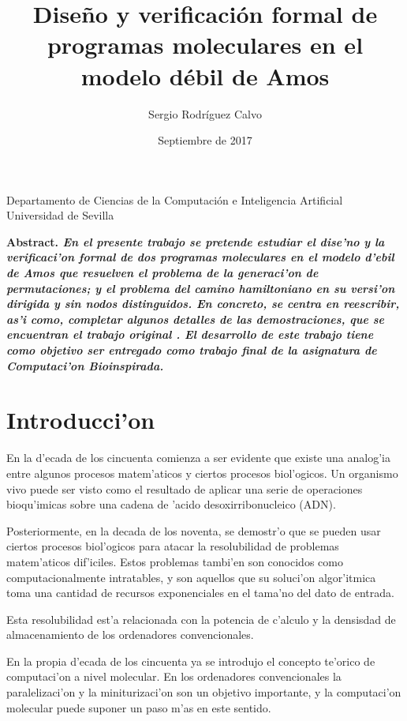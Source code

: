 \documentclass[12pt]{article}
\title{Dise\~no y verificaci\'on formal de programas moleculares en el modelo d\'ebil de Amos}
\author{Sergio Rodr\'iguez Calvo}
\date{Septiembre de 2017}
\begin{document}
    \maketitle
    \thispagestyle{empty}
    \begin{center}
      Departamento de Ciencias de la Computaci\'on e
      Inteligencia Artificial \\
      Universidad de Sevilla
      \end{center}
  \bf{Abstract. }\rm
    \emph{En el presente trabajo se pretende estudiar el dise'no y la verificaci'on formal
    de dos programas moleculares en el modelo d'ebil de Amos que resuelven el problema de la generaci'on
    de permutaciones; y el problema del camino hamiltoniano en su versi'on dirigida y sin
    nodos distinguidos. En concreto, se centra en reescribir, as'i como, completar algunos detalles
    de las demostraciones, que se encuentran el trabajo original \cite{Mario-deJesus}.
    El desarrollo de este trabajo tiene como objetivo ser entregado como trabajo final de la asignatura de
    Computaci'on Bioinspirada.}

\section{Introducci'on}

En la d'ecada de los cincuenta comienza a ser evidente que existe una analog'ia entre algunos procesos
matem'aticos y ciertos procesos biol'ogicos. Un organismo vivo puede ser visto como el resultado de
aplicar una serie de operaciones bioqu'imicas sobre una cadena de 'acido desoxirribonucleico (ADN).

Posteriormente, en la decada de los noventa, se demostr'o que se pueden usar ciertos procesos biol'ogicos
para atacar la resolubilidad de problemas matem'aticos dif'iciles. Estos problemas tambi'en son conocidos
como computacionalmente intratables, y son aquellos que su soluci'on algor'itmica toma una cantidad de
recursos exponenciales en el tama'no del dato de entrada.

Esta resolubilidad est'a relacionada con la potencia de c'alculo y la densisdad de almacenamiento de los
ordenadores convencionales.

En la propia d'ecada de los cincuenta ya se introdujo el concepto te'orico de computaci'on a nivel molecular.
En los ordenadores convencionales la paralelizaci'on y la miniturizaci'on son un objetivo importante, y la
computaci'on molecular puede suponer un paso m'as en este sentido.
\end{document}
